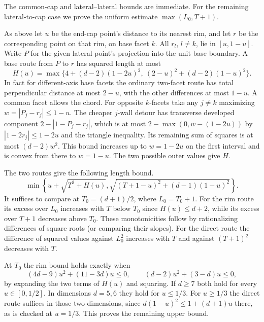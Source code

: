 \documentclass[10pt,letterpaper]{article}
\begin{document}
The common-cap and lateral--lateral bounds are immediate.
For the remaining lateral-to-cap case we prove the uniform estimate
$\max(L_0,T+1)$.

As above let $u$ be the end-cap point's distance to its nearest rim, and
let $r$ be the corresponding point on that rim, on base facet $k$.
All $r_l$, $l\ne k$, lie in $[u,1-u]$. Write $P$ for the given lateral
point's projection into the unit base boundary. A base route from $P$
to $r$ has squared length at most
\[
 H(u)=\max\{4+(d-2)(1-2u)^2,\ (2-u)^2+(d-2)(1-u)^2\}.
\]
In fact for different-axis base facets the ordinary two-facet route
has total perpendicular distance at most $2-u$, with the other
differences at most $1-u$. A common facet allows the chord. For
opposite $k$-facets take any $j\ne k$ maximizing
$w=|P_j-r_j|\le1-u$. The cheaper $j$-wall detour has transverse
developed component $2-|1-P_j-r_j|$, which is at most
$2-\max(0,w-(1-2u))$ by $|1-2r_j|\le1-2u$ and the triangle
inequality. Its remaining sum of squares is at most $(d-2)w^2$.
This bound increases up to $w=1-2u$ on the first interval and is
convex from there to $w=1-u$. The two possible outer values give $H$.

The two routes give the following length bound.
\[
  \min\left\{u+\sqrt{T^2+H(u)},       \sqrt{(T+1-u)^2+(d-1)(1-u)^2}\right\}.
\]
It suffices to compare at
$T_0=(d+1)/2$, where $L_0=T_0+1$. For the rim route its excess over
$L_0$ increases with $T$ below $T_0$ since $H(u)\le d+2$, while its
excess over $T+1$ decreases above $T_0$. These monotonicities follow
by rationalizing differences of square roots (or comparing their slopes).
For the direct route the difference of squared values against $L_0^2$
increases with $T$ and against $(T+1)^2$ decreases with $T$.

At $T_0$ the rim bound holds exactly when
\[
 (4d-9)u^2+(11-3d)u\le0,\qquad
 (d-2)u^2+(3-d)u\le0,
\]
by expanding the two terms of $H(u)$ and squaring. If $d\ge7$ both
hold for every $u\in[0,1/2]$. In dimensions $d=5,6$ they hold for
$u\le1/3$. For $u\ge1/3$ the direct route suffices in those two
dimensions, since $d(1-u)^2\le1+(d+1)u$ there, as is checked at
$u=1/3$. This proves the remaining upper bound.
\end{document}
